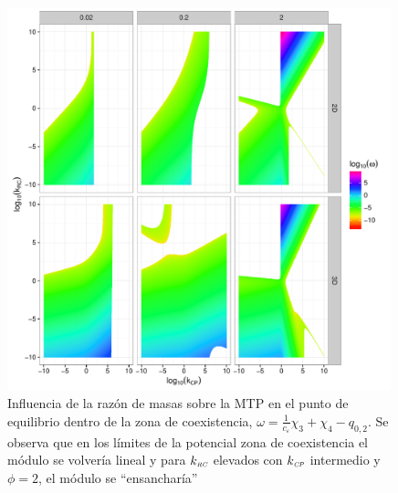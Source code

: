 \begin{figure}
  \centering
  \includegraphics[width = 0.99\textwidth]{./Plots/MTPvar.pdf}
  \caption[MTP]{Influencia de la raz\'on de masas sobre la MTP en el punto de equilibrio dentro de la zona de coexistencia, $\omega = \frac{1}{c_\varepsilon} \chi_3 + \chi_4  - q_{0,2}$. Se observa que en los l\'imites de la potencial zona de coexistencia el m\'odulo se volver\'ia lineal y para $k_{\textit{\tiny RC}}$ elevados con $k_{\textit{\tiny CP}}$ intermedio y $\phi = 2$, el m\'odulo se ``ensanchar\'ia''}
  \label{fig:MTPvar}
\end{figure}

